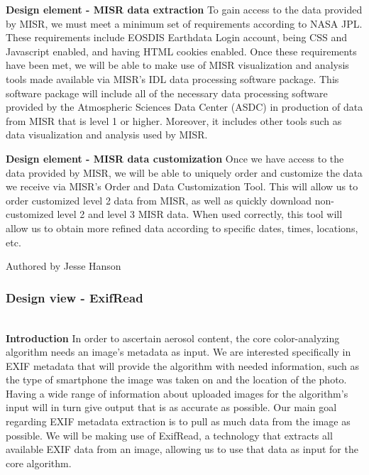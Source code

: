 \documentclass[onecolumn, draftclsnofoot,10pt, compsoc]{IEEEtran}
\begin{document}
\begin{flushleft}
\medskip

\textbf{Design element - MISR data extraction}
To gain access to the data provided by MISR, we must meet a minimum set of requirements according to NASA JPL. These requirements include EOSDIS Earthdata Login account, being CSS and Javascript enabled, and having HTML cookies enabled.
Once these requirements have been met, we will be able to make use of MISR visualization and analysis tools made available via MISR’s IDL data processing software package. This software package will include all of the necessary data processing software provided by the Atmospheric Sciences Data Center (ASDC) in production of data from MISR that is level 1 or higher. Moreover, it includes other tools such as data visualization and analysis used by MISR. \cite{24} 

\medskip

\textbf{Design element - MISR data customization}
Once we have access to the data provided by MISR, we will be able to uniquely order and customize the data we receive via MISR’s Order and Data Customization Tool. \cite{25} This will allow us to order customized level 2 data from MISR, as well as quickly download non-customized level 2 and level 3 MISR data. When used correctly, this tool will allow us to obtain more refined data according to specific dates, times, locations, etc.

\smallskip

\footnotesize Authored by Jesse Hanson
\normalsize

\bigskip



\subsubsection{Design view - ExifRead} \ \\
\textbf{Introduction} In order to ascertain aerosol content, the core color-analyzing algorithm needs an image's metadata as input. We are interested specifically in EXIF metadata that will provide the algorithm with needed information, such as the type of smartphone the image was taken on and the location of the photo. Having a wide range of information about uploaded images for the algorithm's input will in turn give output that is as accurate as possible. Our main goal regarding EXIF metadata extraction is to pull as much data from the image as possible. We will be making use of ExifRead, a technology that extracts all available EXIF data from an image, allowing us to use that data as input for the core algorithm. 



\end{flushleft}
\end{document}
